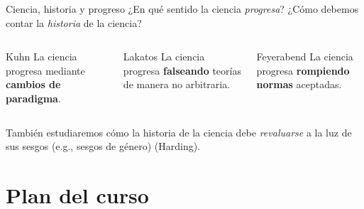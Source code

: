 \documentclass[%
  9pt,
  spanish, %
  ignorenonframetext,
  aspectratio=169, %
]{beamer}
\begin{document}
\begin{frame}{Ciencia, historia y progreso}
  \protect{}\label{ciencia-historia-y-progreso}
  ¿En qué sentido la ciencia \emph{progresa}? ¿Cómo debemos contar la
  \emph{historia} de la ciencia? \vspace{-1em}

  \begin{columns}[T,onlytextwidth]
    \begin{column}{0.3\linewidth}
      \begin{block}{Kuhn}
        \protect{}\label{kuhn}
        La ciencia progresa mediante \textbf{cambios de paradigma}.
      \end{block}
    \end{column}

    \begin{column}{0.3\linewidth}
      \begin{block}{Lakatos}
        \protect{}\label{lakatos}
        La ciencia progresa \textbf{falseando} teorías de manera no arbitraria.
      \end{block}
    \end{column}

    \begin{column}{0.3\linewidth}
      \begin{block}{Feyerabend}
        \protect{}\label{feyerabend}
        La ciencia progresa \textbf{rompiendo normas} aceptadas.
      \end{block}
    \end{column}
  \end{columns}

  \vspace{1em}

  También estudiaremos cómo la historia de la ciencia debe
  \emph{revaluarse} a la luz de sus sesgos (e.g., sesgos de género)
  (Harding).
\end{frame}

\section{Plan del curso}\label{plan-del-curso}
\end{document}
